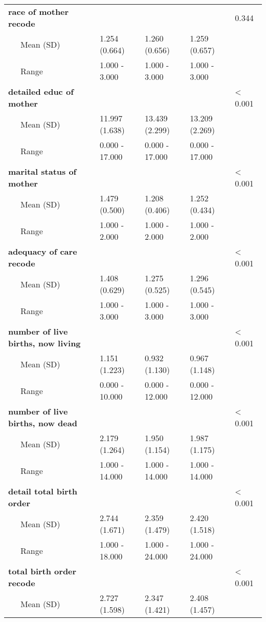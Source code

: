 \begin{longtable}[c]{@{}lllll@{}}
\textbf{race of mother recode} & & & & 0.344
\\\addlinespace
~~~Mean (SD) & 1.254 (0.664) & 1.260 (0.656) & 1.259 (0.657) &
\\\addlinespace
~~~Range & 1.000 - 3.000 & 1.000 - 3.000 & 1.000 - 3.000 &
\\\addlinespace
\textbf{detailed educ of mother} & & & & \textless{} 0.001
\\\addlinespace
~~~Mean (SD) & 11.997 (1.638) & 13.439 (2.299) & 13.209 (2.269) &
\\\addlinespace
~~~Range & 0.000 - 17.000 & 0.000 - 17.000 & 0.000 - 17.000 &
\\\addlinespace
\textbf{marital status of mother} & & & & \textless{} 0.001
\\\addlinespace
~~~Mean (SD) & 1.479 (0.500) & 1.208 (0.406) & 1.252 (0.434) &
\\\addlinespace
~~~Range & 1.000 - 2.000 & 1.000 - 2.000 & 1.000 - 2.000 &
\\\addlinespace
\textbf{adequacy of care recode} & & & & \textless{} 0.001
\\\addlinespace
~~~Mean (SD) & 1.408 (0.629) & 1.275 (0.525) & 1.296 (0.545) &
\\\addlinespace
~~~Range & 1.000 - 3.000 & 1.000 - 3.000 & 1.000 - 3.000 &
\\\addlinespace
\textbf{number of live births, now living} & & & & \textless{} 0.001
\\\addlinespace
~~~Mean (SD) & 1.151 (1.223) & 0.932 (1.130) & 0.967 (1.148) &
\\\addlinespace
~~~Range & 0.000 - 10.000 & 0.000 - 12.000 & 0.000 - 12.000 &
\\\addlinespace
\textbf{number of live births, now dead} & & & & \textless{} 0.001
\\\addlinespace
~~~Mean (SD) & 2.179 (1.264) & 1.950 (1.154) & 1.987 (1.175) &
\\\addlinespace
~~~Range & 1.000 - 14.000 & 1.000 - 14.000 & 1.000 - 14.000 &
\\\addlinespace
\textbf{detail total birth order} & & & & \textless{} 0.001
\\\addlinespace
~~~Mean (SD) & 2.744 (1.671) & 2.359 (1.479) & 2.420 (1.518) &
\\\addlinespace
~~~Range & 1.000 - 18.000 & 1.000 - 24.000 & 1.000 - 24.000 &
\\\addlinespace
\textbf{total birth order recode} & & & & \textless{} 0.001
\\\addlinespace
~~~Mean (SD) & 2.727 (1.598) & 2.347 (1.421) & 2.408 (1.457) &

\end{longtable}
